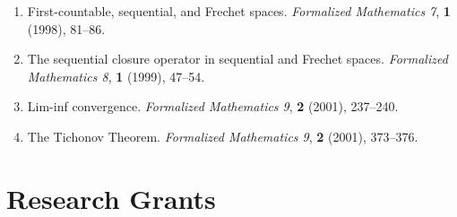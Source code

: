 \documentclass{article}
\begin{document}
\begin{enumerate}
{    14}, 1 (2003), 103--118.\\
  \ \\
  \
{\sc Publications related to the project Mizar }
\item First-countable, sequential, and {F}rechet spaces.  {\em
    Formalized Mathematics 7}, {\bf 1} (1998), 81--86.
\item The sequential closure operator in sequential and {F}rechet spaces.
{\em Formalized Mathematics 8}, {\bf 1} (1999), 47--54.
\item Lim-inf convergence.  {\em Formalized Mathematics 9}, {\bf 2}
  (2001), 237--240.
\item The {T}ichonov {T}heorem. {\em Formalized Mathematics 9}, {\bf 2} (2001), 373--376.
\end{enumerate}                 



\section{Research Grants}
\end{document}
